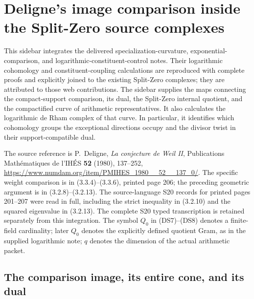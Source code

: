 \documentclass{article}
\begin{document}
\maketitle
\section{Deligne's image comparison inside the Split-Zero source complexes}
\label{sec:deligne-split-sidebar}

This sidebar integrates the delivered specialization-curvature, exponential-comparison,
and logarithmic-constituent-control notes. Their logarithmic cohomology and
constituent-coupling calculations are reproduced with complete proofs and
explicitly joined to the existing Split-Zero complexes; they are attributed
to those web contributions. The sidebar supplies the maps connecting the compact-support comparison,
its dual, the Split-Zero internal quotient, and the compactified curve of
arithmetic representatives.  It also calculates the logarithmic de Rham
complex of that curve.  In particular, it identifies which cohomology
groups the exceptional directions occupy and the divisor twist in their
support-compatible dual.

The source reference is P.~Deligne, \emph{La conjecture de Weil II},
Publications Math\'ematiques de l'IH\'ES \textbf{52} (1980), 137--252,
\url{https://www.numdam.org/item/PMIHES_1980__52__137_0/}.
The specific weight comparison is in (3.3.4)--(3.3.6), printed page 206;
the preceding geometric argument is in (3.2.8)--(3.2.13).
The source-language S20 records for printed pages 201--207 were read in full,
including the strict inequality in (3.2.10) and the squared eigenvalue in
(3.2.13). The complete S20 typed transcription is retained separately from
this integration.  The symbol $Q_0$ in (DS7)--(DS8) denotes a finite-field
cardinality; later $Q_0$ denotes the explicitly defined quotient Gram,
as in the supplied logarithmic note; $q$ denotes the dimension of the actual arithmetic packet.

\subsection{The comparison image, its entire cone, and its dual}
\end{document}
